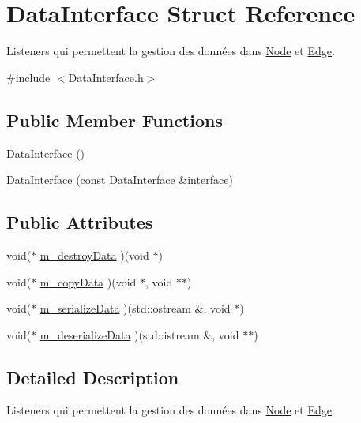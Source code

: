 \hypertarget{struct_data_interface}{}\section{Data\+Interface Struct Reference}
\label{struct_data_interface}


Listeners qui permettent la gestion des données dans \mbox{\hyperlink{class_node}{Node}} et \mbox{\hyperlink{class_edge}{Edge}}.  




{\ttfamily \#include $<$Data\+Interface.\+h$>$}

\subsection*{Public Member Functions}
\begin{DoxyCompactItemize}
\item 
\mbox{\hyperlink{struct_data_interface_a6c52feeda005b02d5172573c7c4d4a24}{Data\+Interface}} ()
\item 
\mbox{\hyperlink{struct_data_interface_a4e1adf6b36493994157224248beacf85}{Data\+Interface}} (const \mbox{\hyperlink{struct_data_interface}{Data\+Interface}} \&interface)
\end{DoxyCompactItemize}
\subsection*{Public Attributes}
\begin{DoxyCompactItemize}
\item 
void($\ast$ \mbox{\hyperlink{struct_data_interface_af6e607324293e0206fda4acbdfafe043}{m\+\_\+destroy\+Data}} )(void $\ast$)
\item 
void($\ast$ \mbox{\hyperlink{struct_data_interface_a861c2689215956b596d6f1e9d279dd94}{m\+\_\+copy\+Data}} )(void $\ast$, void $\ast$$\ast$)
\item 
void($\ast$ \mbox{\hyperlink{struct_data_interface_a111a5b62fe0a45d937795853c8337d06}{m\+\_\+serialize\+Data}} )(std\+::ostream \&, void $\ast$)
\item 
void($\ast$ \mbox{\hyperlink{struct_data_interface_a53674c91ee0983fb20429291631d88f0}{m\+\_\+deserialize\+Data}} )(std\+::istream \&, void $\ast$$\ast$)
\end{DoxyCompactItemize}


\subsection{Detailed Description}
Listeners qui permettent la gestion des données dans \mbox{\hyperlink{class_node}{Node}} et \mbox{\hyperlink{class_edge}{Edge}}. 

